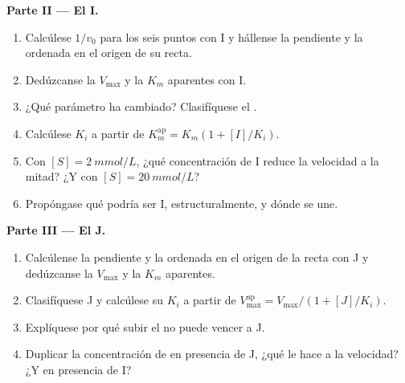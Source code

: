 \begin{problem}
\medskip
\noindent\textbf{Parte II --- El  I.}
\begin{enumerate}[resume]
  \item Calcúlese $1/v_0$ para los seis puntos con I y hállense la
        pendiente y la ordenada en el origen de su recta.
  \item Dedúzcanse la $V_{\max}$ y la $K_m$ aparentes con I.
  \item ¿Qué parámetro ha cambiado? Clasifíquese el .
  \item Calcúlese $K_i$ a partir de $K_m^{\text{ap}} = K_m(1 + [I]/K_i)$.
  \item Con $[S] = \qty{2}{mmol/L}$, ¿qué concentración de I reduce la
        velocidad a la mitad? ¿Y con $[S] = \qty{20}{mmol/L}$?
  \item Propóngase qué podría ser I, estructuralmente, y dónde se une.
\end{enumerate}

\medskip
\noindent\textbf{Parte III --- El  J.}
\begin{enumerate}[resume]
  \item Calcúlense la pendiente y la ordenada en el origen de la recta con
        J y dedúzcanse la $V_{\max}$ y la $K_m$ aparentes.
  \item Clasifíquese J y calcúlese su $K_i$ a partir de
        $V_{\max}^{\text{ap}} =
        V_{\max}/(1 + [J]/K_i)$.
  \item Explíquese por qué subir el  no puede vencer a J.
  \item Duplicar la concentración de  en presencia de J, ¿qué le hace
        a la velocidad? ¿Y en presencia de I?
\end{enumerate}


\end{problem}
